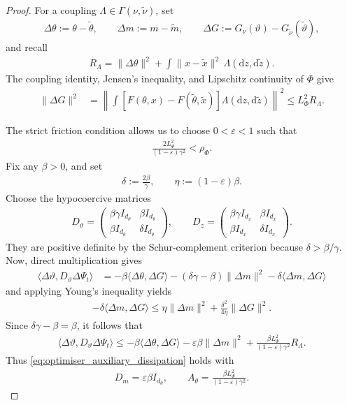 \begin{proof}
For a coupling $\Lambda\in\Gamma(\nu,\tilde\nu)$, set
\begin{align*}
\Delta\theta:=\theta-\tilde\theta,
\qquad
\Delta m:=m-\tilde m,
\qquad
\Delta G:=G_\nu(\vartheta)-G_{\tilde\nu}(\tilde\vartheta),
\end{align*}
and recall
\begin{align*}
R_\Lambda
=
\|\Delta\theta\|^2
+
\int\|x-\tilde x\|^2\,
\Lambda(\mathrm dz,\mathrm d\tilde z).
\end{align*}
The coupling identity, Jensen's inequality, and Lipschitz continuity of
$\Phi$ give
\begin{align*}
\|\Delta G\|^2
&=
\left\|
\int
\left[F(\theta,x)-F(\tilde\theta,\tilde x)\right]
\Lambda(\mathrm dz,\mathrm d\tilde z)
\right\|^2\leq
L_\Phi^2R_\Lambda.
\end{align*}

The strict friction condition allows us to choose
$0<\varepsilon<1$ such that
\begin{align*}
\frac{2L_\Phi^2}{(1-\varepsilon)\gamma^2}<\rho_\Phi.
\end{align*}
Fix any $\beta>0$, and set
\begin{align*}
\delta:=\frac{2\beta}{\gamma},
\qquad
\eta:=(1-\varepsilon)\beta.
\end{align*}
Choose the hypocoercive matrices
\begin{align*}
D_\vartheta
=
\begin{pmatrix}
\beta\gamma I_{d_\theta}&\beta I_{d_\theta}\\
\beta I_{d_\theta}&\delta I_{d_\theta}
\end{pmatrix},
\qquad
D_z
=
\begin{pmatrix}
\beta\gamma I_{d_x}&\beta I_{d_x}\\
\beta I_{d_x}&\delta I_{d_x}
\end{pmatrix}.
\end{align*}
They are positive definite by the Schur-complement criterion because
$\delta>\beta/\gamma$. Now, direct multiplication gives
\begin{align*}
\langle\Delta\vartheta,D_\vartheta\Delta\Psi_t\rangle
&=
-\beta\langle\Delta\theta,\Delta G\rangle
-(\delta\gamma-\beta)\|\Delta m\|^2
-\delta\langle\Delta m,\Delta G\rangle
\end{align*}
and applying Young's inequality yields
\begin{align*}
-\delta\langle\Delta m,\Delta G\rangle
\leq
\eta\|\Delta m\|^2
+
\frac{\delta^2}{4\eta}\|\Delta G\|^2.
\end{align*}
Since $\delta\gamma-\beta=\beta$, it follows that
\begin{align*}
\langle\Delta\vartheta,D_\vartheta\Delta\Psi_t\rangle
\leq
-\beta\langle\Delta\theta,\Delta G\rangle
-\varepsilon\beta\|\Delta m\|^2
+
\frac{\beta L_\Phi^2}{(1-\varepsilon)\gamma^2}R_\Lambda.
\end{align*}
Thus \eqref{eq:optimiser_auxiliary_dissipation} holds with
\begin{align*}
D_m=\varepsilon\beta I_{d_\theta},
\qquad
A_\theta
=\frac{\beta L_\Phi^2}{(1-\varepsilon)\gamma^2}.
\end{align*}


\end{proof}
